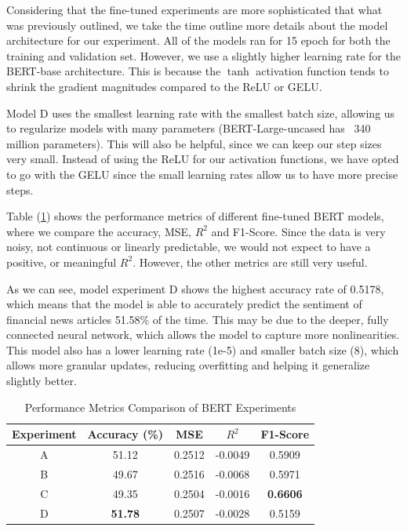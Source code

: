 \documentclass[12pt]{article}
\begin{document}
Considering that the fine-tuned experiments are more sophisticated that what was previously outlined, we take the time outline more details about the model architecture for our experiment. All of the models ran for 15 epoch for both the training and validation set. However, we use a slightly higher learning rate for the BERT-base architecture. This is because the $\tanh$ activation function tends to shrink the gradient magnitudes compared to the ReLU or GELU. 

Model D uses the smallest learning rate with the smallest batch size, allowing us to regularize models with many parameters (BERT-Large-uncased has ~340 million parameters). This will also be helpful, since we can keep our step sizes very small. Instead of using the ReLU for our activation functions, we have opted to go with the GELU since the small learning rates allow us to have more precise steps.

Table (\ref{tab:performance_metrics}) shows the performance metrics of different fine-tuned BERT models, where we compare the accuracy, MSE, $R^2$ and F1-Score. Since the data is very noisy, not continuous or linearly predictable, we would not expect to have a positive, or meaningful $R^2$. However, the other metrics are still very useful.

As we can see, model experiment D shows the highest accuracy rate of 0.5178, which means that the model is able to accurately predict the sentiment of financial news articles 51.58\% of the time. This may be due to the deeper, fully connected neural network, which allows the model to capture more nonlinearities. This model also has a lower learning rate (1e-5) and smaller batch size (8), which allows more granular updates, reducing overfitting and helping it generalize slightly better.

\begin{table}[h!]
	\centering
	\caption{Performance Metrics Comparison of BERT Experiments}
	\begin{tabular}{ccccc}
		\hline
		\textbf{Experiment} & \textbf{Accuracy (\%)} & \textbf{MSE} & $R^2$ & \textbf{F1-Score} \\ \hline
		A & 51.12 & 0.2512 & -0.0049 & 0.5909 \\ 
		B & 49.67 & 0.2516 & -0.0068 & 0.5971 \\ 
		C & 49.35 & 0.2504 & -0.0016 & \color{red}\textbf{0.6606} \\ 
		D & \color{red}\textbf{51.78} & 0.2507 & -0.0028 & 0.5159 \\ \hline
	\end{tabular}
	\label{tab:performance_metrics}
\end{table}
\end{document}
